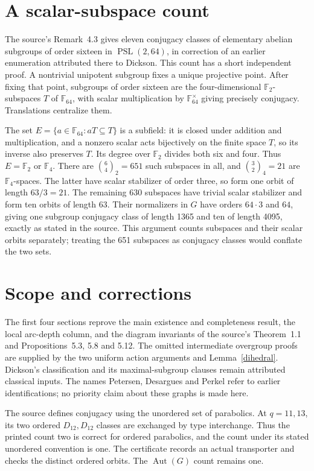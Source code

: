 \documentclass[11pt,a4paper]{article}
\newcommand{\PSL}{\operatorname{PSL}}\newcommand{\PGL}{\operatorname{PGL}}
\newcommand{\Aut}{\operatorname{Aut}}\newcommand{\F}{\mathbb F}
\begin{document}
\section{A scalar-subspace count}
The source's Remark~4.3 gives eleven conjugacy classes of elementary abelian
subgroups of order sixteen in $\PSL(2,64)$, in correction of an earlier
enumeration attributed there to Dickson. This count has a short independent
proof. A nontrivial unipotent subgroup fixes a unique projective point.
After fixing that point, subgroups of order sixteen are the four-dimensional
$\F_2$-subspaces $T$ of $\F_{64}$, with scalar multiplication by
$\F_{64}^{\times}$ giving precisely conjugacy. Translations centralize them.

The set $E=\{a\in\F_{64}:aT\subseteq T\}$ is a subfield: it is closed
under addition and multiplication, and a nonzero scalar acts bijectively on
the finite space $T$, so its inverse also preserves $T$. Its degree over
$\F_2$ divides both six and four. Thus $E=\F_2$ or $\F_4$.
There are $\binom{6}{4}_2=651$ such subspaces in all, and
$\binom{3}{2}_4=21$ are $\F_4$-spaces. The latter have scalar stabilizer
of order three, so form one orbit of length $63/3=21$. The remaining
$630$ subspaces have trivial scalar stabilizer and form ten orbits of
length 63. Their normalizers in $G$ have orders $64\cdot3$ and $64$,
giving one subgroup conjugacy class of length 1365 and ten of length 4095,
exactly as stated in the source. This argument counts subspaces and their
scalar orbits separately; treating the 651 subspaces as conjugacy classes
would conflate the two sets.

\section{Scope and corrections}
The first four sections reprove the main existence and completeness result,
the local arc-depth column, and the diagram invariants of the source's
Theorem~1.1 and Propositions~5.3, 5.8 and 5.12. The omitted intermediate
overgroup proofs are supplied by the two uniform action arguments and
Lemma~\ref{dihedral}. Dickson's classification and its maximal-subgroup
clauses remain attributed classical inputs. The names Petersen, Desargues
and Perkel refer to earlier identifications; no priority claim about these
graphs is made here.

The source defines conjugacy using the unordered set of parabolics. At
$q=11,13$, its two ordered $D_{12},D_{12}$ classes are exchanged by
type interchange. Thus the printed count two is correct for ordered
parabolics, and the count under its stated unordered convention is one.
The certificate records an actual transporter and checks the distinct
ordered orbits. The $\Aut(G)$ count remains one.
\end{document}
